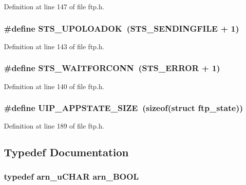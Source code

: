 Definition at line 147 of file ftp.h.

\hypertarget{group__ftp_ga24c39c192e52b089875c082a055176d2}{
\subsubsection[{STS\_\-UPOLOADOK}]{\setlength{\rightskip}{0pt plus 5cm}\#define STS\_\-UPOLOADOK~(STS\_\-SENDINGFILE + 1)}}
\label{group__ftp_ga24c39c192e52b089875c082a055176d2}


Definition at line 143 of file ftp.h.

\hypertarget{group__ftp_gae144fc3376441fba0f34150f365d2ea5}{
\subsubsection[{STS\_\-WAITFORCONN}]{\setlength{\rightskip}{0pt plus 5cm}\#define STS\_\-WAITFORCONN~(STS\_\-ERROR + 1)}}
\label{group__ftp_gae144fc3376441fba0f34150f365d2ea5}


Definition at line 140 of file ftp.h.

\hypertarget{group__ftp_ga0eae627d0514fa41cbc8fda0740f5794}{
\subsubsection[{UIP\_\-APPSTATE\_\-SIZE}]{\setlength{\rightskip}{0pt plus 5cm}\#define UIP\_\-APPSTATE\_\-SIZE~(sizeof(struct {\bf ftp\_\-state}))}}
\label{group__ftp_ga0eae627d0514fa41cbc8fda0740f5794}


Definition at line 189 of file ftp.h.



\subsection{Typedef Documentation}
\hypertarget{group__ftp_gaa90ab1d85ab7976982506605e340be8b}{
\subsubsection[{arn\_\-BOOL}]{\setlength{\rightskip}{0pt plus 5cm}typedef {\bf arn\_\-uCHAR} {\bf arn\_\-BOOL}}}
\label{group__ftp_gaa90ab1d85ab7976982506605e340be8b}



